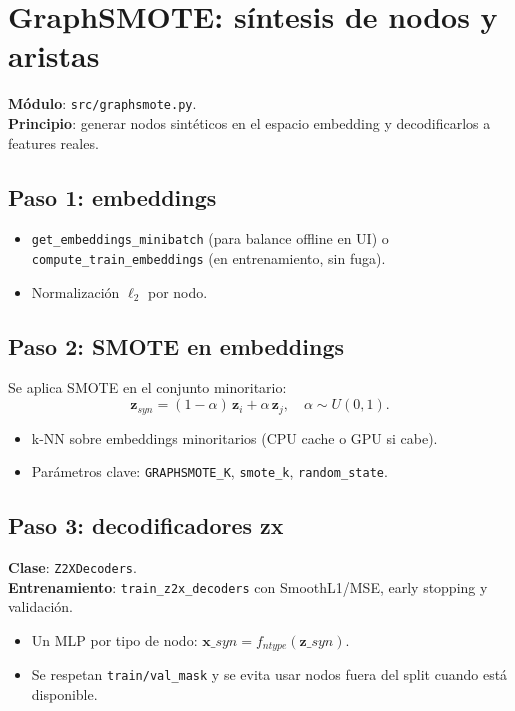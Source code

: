 \section{GraphSMOTE: s\'intesis de nodos y aristas}
\label{sec:graphsmote}
\textbf{M\'odulo}: \texttt{src/graphsmote.py}.\\
\textbf{Principio}: generar nodos sint\'eticos en el espacio embedding y decodificarlos a features reales.

\subsection{Paso 1: embeddings}
\begin{itemize}[leftmargin=*]
  \item \texttt{get\_embeddings\_minibatch} (para balance offline en UI) o \texttt{compute\_train\_embeddings} (en entrenamiento, sin fuga).
  \item Normalizaci\'on $\ell_2$ por nodo.
\end{itemize}

\subsection{Paso 2: SMOTE en embeddings}
Se aplica SMOTE en el conjunto minoritario:
\[
\mathbf{z}_{syn} = (1-\alpha)\,\mathbf{z}_i + \alpha\,\mathbf{z}_j,\quad \alpha \sim U(0,1).
\]
\begin{itemize}[leftmargin=*]
  \item k-NN sobre embeddings minoritarios (CPU cache o GPU si cabe).
  \item Par\'ametros clave: \texttt{GRAPHSMOTE\_K}, \texttt{smote\_k}, \texttt{random\_state}.
\end{itemize}

\subsection{Paso 3: decodificadores z\textrightarrow x}
\textbf{Clase}: \texttt{Z2XDecoders}.\\
\textbf{Entrenamiento}: \texttt{train\_z2x\_decoders} con SmoothL1/MSE, early stopping y validaci\'on.
\begin{itemize}[leftmargin=*]
  \item Un MLP por tipo de nodo: $\mathbf{x}\_{syn} = f_{ntype}(\mathbf{z}\_{syn})$.
  \item Se respetan \texttt{train/val\_mask} y se evita usar nodos fuera del split cuando est\'a disponible.
\end{itemize}


